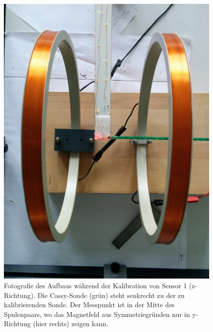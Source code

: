 \documentclass[12pt,a4paper]{article}
\begin{document}
\begin{figure}[H]
	\centering
	\includegraphics[scale=0.1]{kalib1.jpg}
	\caption{Fotografie des Aufbaus während der Kalibration von Sensor 1 (z-Richtung). Die Cassy-Sonde (grün) steht senkrecht zu der zu kalibrierenden Sonde. Der Messpunkt ist in der Mitte des Spulenpaars, wo das Magnetfeld aus Symmetriegründen nur in y-Richtung (hier rechts) zeigen kann.}
	\label{kalib1}
\end{figure}
\end{document}
